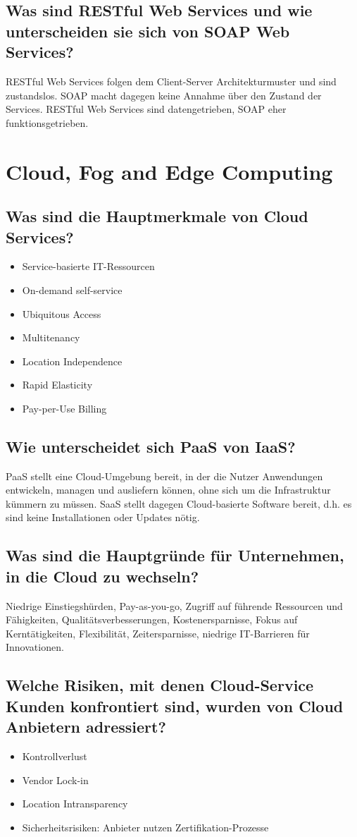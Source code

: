\documentclass{article}
\begin{document}
\subsection{Was sind RESTful Web Services und wie unterscheiden sie sich von SOAP Web Services?}
RESTful Web Services folgen dem Client-Server Architekturmuster und sind zustandslos.
SOAP macht dagegen keine Annahme über den Zustand der Services.
RESTful Web Services sind datengetrieben, SOAP eher funktionsgetrieben.
\section{Cloud, Fog and Edge Computing}
\subsection{Was sind die Hauptmerkmale von Cloud Services?}
\begin{itemize}
    \item Service-basierte IT-Ressourcen
    \item On-demand self-service
    \item Ubiquitous Access
    \item Multitenancy
    \item Location Independence
    \item Rapid Elasticity
    \item Pay-per-Use Billing
\end{itemize}
\subsection{Wie unterscheidet sich PaaS von IaaS?}
PaaS stellt eine Cloud-Umgebung bereit, in der die Nutzer Anwendungen entwickeln, managen und ausliefern können, ohne sich um die Infrastruktur kümmern zu müssen.
SaaS stellt dagegen Cloud-basierte Software bereit, d.h. es sind keine Installationen oder Updates nötig.
\subsection{Was sind die Hauptgründe für Unternehmen, in die Cloud zu wechseln?}
Niedrige Einstiegshürden, Pay-as-you-go, Zugriff auf führende Ressourcen und Fähigkeiten, Qualitätsverbesserungen, Kostenersparnisse, Fokus auf Kerntätigkeiten, Flexibilität, Zeitersparnisse, niedrige IT-Barrieren für Innovationen.
\subsection{Welche Risiken, mit denen Cloud-Service Kunden konfrontiert sind, wurden von Cloud Anbietern adressiert?}
\begin{itemize}
    \item Kontrollverlust
    \item Vendor Lock-in
    \item Location Intransparency
    \item Sicherheitsrisiken: Anbieter nutzen Zertifikation-Prozesse
\end{itemize}
\end{document}
